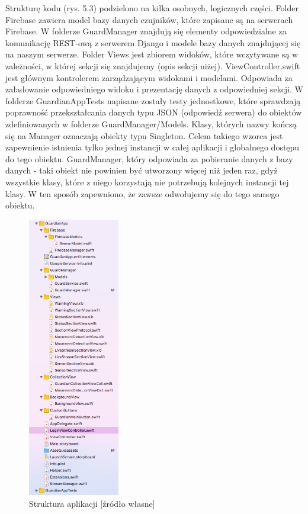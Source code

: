 Strukturę kodu (rys. 5.3) podzielono na kilka osobnych, logicznych części. Folder Firebase zawiera model bazy danych czujników, które zapisane są na serwerach Firebase. W folderze GuardManager znajdują się elementy odpowiedzialne za komunikację REST-ową z serwerem Django i modele bazy danych znajdującej się na naszym serwerze. Folder Views jest zbiorem widoków, które wczytywane są w zależności, w której sekcji się znajdujemy (opis sekcji niżej). ViewController.swift jest głównym kontrolerem zarządzającym widokami i modelami. Odpowiada za załadowanie odpowiedniego widoku i prezentację danych z odpowiedniej sekcji. W folderze GuardianAppTests napisane zostały testy jednostkowe, które sprawdzają poprawność przekształcania danych typu JSON (odpowiedź serwera) do obiektów zdefiniowanych w folderze GuardManager/Models. Klasy, których nazwy kończą się na Manager oznaczają obiekty typu Singleton. Celem takiego wzorca jest zapewnienie istnienia tylko jednej instancji w całej aplikacji i globalnego dostępu do tego obiektu. GuardManager, który odpowiada za pobieranie danych z bazy danych - taki obiekt nie powinien być utworzony więcej niż jeden raz, gdyż wszystkie klasy, które z niego korzystają nie potrzebują kolejnych instancji tej klasy. W ten sposób zapewniono, że zawsze odwołujemy się do tego samego obiektu.
\begin{figure}[ht]
	\centering
	\includegraphics[width=4cm]{ios_screenshots/iOSstructure.png}
	\caption{Struktura aplikacji [źródło własne]}
\end{figure}
